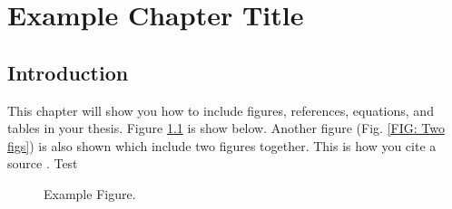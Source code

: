 \chapter{\leavevmode\newline Example Chapter Title}
\label{chap:chapter_2}



\section{Introduction}
This chapter will show you how to include figures, references, equations, and tables in your thesis. Figure \ref{FIG: engine and num model diagram} is show below. Another figure (Fig. \ref{FIG: Two figs}) is also shown which include two figures together. This is how you cite a source \cite{yang2019bee+} \cite{nellis_klein_2012}. Test


\begin{figure}
\centering
        \caption{Example Figure.}
        \label{FIG: engine and num model diagram}
\end{figure}


